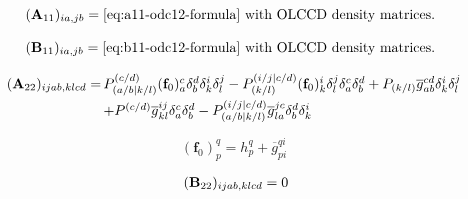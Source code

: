 \begin{subappendices}
    \begin{equation}
        (\mathbf{A}_{11})_{ia,jb}
        =
        \text{%
            \Cref{eq:a11-odc12-formula} with OLCCD density matrices.
        }
    \end{equation}

    \begin{equation}
        (\mathbf{B}_{11})_{ia,jb}
        =
        \text{%
            \Cref{eq:b11-odc12-formula} with OLCCD density matrices.
        }
    \end{equation}

    \begin{equation}
        \begin{array}{r@{\,}l}
            (\mathbf{A}_{22})_{ijab,klcd}
            =
            &
            P_{(a/b|k/l)}^{(c/d)}
            (\mathbf{f}_0)_a^c
            \delta_b^d
            \delta_k^i
            \delta_l^j
            -
            P_{(k/l)}^{(i/j|c/d)}
            (\mathbf{f}_0)_k^i
            \delta_l^j
            \delta_a^c
            \delta_b^d
            +
            P_{(k/l)}
            \overline{g}_{ab}^{cd}
            \delta_k^i
            \delta_l^j
            \\[5pt]
            &
            +
            P^{(c/d)}
            \overline{g}_{kl}^{ij}
            \delta_a^c
            \delta_b^d
            -
            P_{(a/b|k/l)}^{(i/j|c/d)}
            \overline{g}_{la}^{jc}
            \delta_b^d
            \delta_k^i
        \end{array}
    \end{equation}

    \begin{equation}
        (\mathbf{f}_0)_p^q
        =
        h_p^q
        +
        \overline{g}_{pi}^{qi}
    \end{equation}

    \begin{equation}
        \begin{array}{r@{\,}l}
            (\mathbf{B}_{22})_{ijab,klcd}
            =
            0
        \end{array}
    \end{equation}


\end{subappendices}
